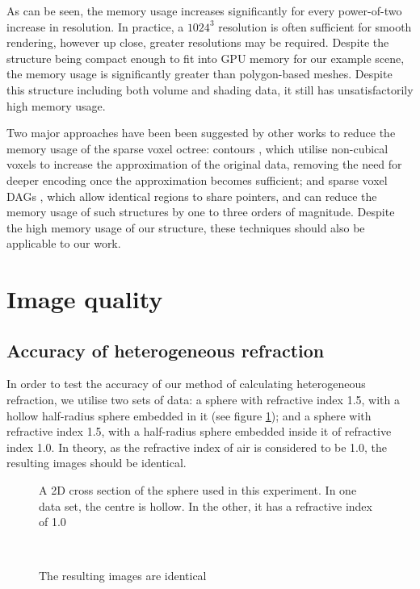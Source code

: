 As can be seen, the memory usage increases significantly for every power-of-two increase in resolution. In practice, a $1024^3$ resolution is often sufficient for smooth rendering, however up close, greater resolutions may be required. Despite the structure being compact enough to fit into GPU memory for our example scene, the memory usage is significantly greater than polygon-based meshes. Despite this structure including both volume and shading data, it still has unsatisfactorily high memory usage.

Two major approaches have been been suggested by other works to reduce the memory usage of the sparse voxel octree: contours \parencite{laine10efficientsvos}, which utilise non-cubical voxels to increase the approximation of the original data, removing the need for deeper encoding once the approximation becomes sufficient; and sparse voxel DAGs \parencite{kampe2013dags}, which allow identical regions to share pointers, and can reduce the memory usage of such structures by one to three orders of magnitude. Despite the high memory usage of our structure, these techniques should also be applicable to our work.

\section{Image quality}

\subsection{Accuracy of heterogeneous refraction}
In order to test the accuracy of our method of calculating heterogeneous refraction, we utilise two sets of data: a sphere with refractive index 1.5, with a hollow half-radius sphere embedded in it (see figure \ref{fig:half-radius-sphere}); and a sphere with refractive index 1.5, with a half-radius sphere embedded inside it of refractive index 1.0. In theory, as the refractive index of air is considered to be 1.0, the resulting images should be identical.

\begin{figure}
	\centering

	\caption{A 2D cross section of the sphere used in this experiment. In one data set, the centre is hollow. In the other, it has a refractive index of 1.0}
	\label{fig:half-radius-sphere}
\end{figure}

\begin{figure}
	\centering
	~

	\caption{The resulting images are identical}
	\label{fig:heterogeneous_refraction}
\end{figure}


